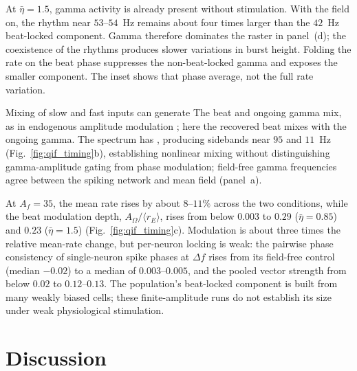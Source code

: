 \documentclass[11pt,a4paper]{article}
\providecommand{\DIFaddtex}[1]{{\protect\color{blue} \sf #1}} %
\providecommand{\DIFdeltex}[1]{{\protect\color{red} \scriptsize #1}} %
\providecommand{\DIFaddbegin}{} %
\providecommand{\DIFaddend}{} %
\providecommand{\DIFdelbegin}{} %
\providecommand{\DIFdelend}{} %
\providecommand{\DIFadd}[1]{\texorpdfstring{\DIFaddtex{#1}}{#1}} %
\providecommand{\DIFdel}[1]{\texorpdfstring{\DIFdeltex{#1}}{}} %
\begin{document}
At $\bar\eta=1.5$, gamma activity is already present without stimulation. With the
field on, the rhythm near $53$--$54$~Hz remains about four times larger than the
$42$~Hz beat-locked component. Gamma therefore dominates the raster in panel~(d);
the coexistence of the rhythms produces slower variations in burst height. Folding the
rate on the beat phase suppresses the non-beat-locked gamma and exposes the smaller
component. The inset shows that phase average, not the full rate variation.

\DIFdelbegin \DIFdel{Mixing of slow and fast inputs can generate }\DIFdelend \DIFaddbegin \DIFadd{The beat and ongoing gamma mix, as in }\DIFaddend endogenous amplitude modulation
\cite{ruffini2025ham}\DIFdelbegin \DIFdel{; here the recovered beat mixes with the ongoing gamma.
The spectrum has }\DIFdelend \DIFaddbegin \DIFadd{, producing }\DIFaddend sidebands near $95$ and $11$~Hz
(Fig.~\ref{fig:qif_timing}b), establishing nonlinear mixing without distinguishing
gamma-amplitude gating from phase modulation; field-free gamma frequencies agree
between the spiking network and mean field (panel~a).

At $A_f=35$, the mean rate rises by about $8$--$11\%$ across the two conditions, while the beat modulation
depth, $A_\Omega/\langle r_E\rangle$, rises from below $0.003$ to $0.29$
($\bar\eta=0.85$) and $0.23$ ($\bar\eta=1.5$) (Fig.~\ref{fig:qif_timing}c). Modulation is about three times the relative mean-rate change, but per-neuron
locking is weak: the pairwise phase consistency of single-neuron spike phases at
$\Delta f$ rises from its field-free control (median $-0.02$) to a median of
$0.003$--$0.005$, and the pooled vector strength from below $0.02$ to $0.12$--$0.13$. The
population's beat-locked component is built from many weakly biased cells; these
finite-amplitude runs do not establish its size under weak physiological stimulation.

\section{Discussion}\label{sec:discussion}
\end{document}
